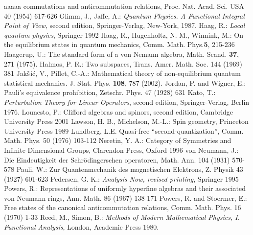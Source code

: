 \documentclass{svmult}
\begin{document}
\begin{remark}
\begin{thebibliography}{aaaaa}
  commutations and anticommutation relations, Proc. Nat. Acad. Sci. USA 40
  (1954) 617-626
 Glimm, J., Jaffe, A.: {\it Quantum Physics. A Functional 
Integral Point of View}, second edition, Springer-Verlag, New-York, 1987.
 Haag, R.: {\it Local quantum physics}, Springer 1992
 Haag, R., Hugenholtz, N. M., Winnink, M.: On the equilibrium
  states  in quantum mechanics, Comm. Math. Phys.{\bf  5}, 215-236
 Haagerup, U.: The standard form of a von Nemann
algebra, Math. Scand. {\bf 37}, 271 (1975).
 Halmos, P. R.: Two subspaces, Trans. Amer. Math. Soc. 144 (1969)
  381 
 Jak${\check {\rm s}}$i\'c, V., Pillet, C.-A.: 
Mathematical theory of non-equilibrium quantum statistical 
mechanics. J. Stat. Phys. {\bf 108}, 787 (2002).
 Jordan, P. and Wigner, E.: Pauli's equivalence prohibition,
  Zetschr. Phys. 47 (1928) 631
 Kato, T.: {\em Perturbation Theory for Linear Operators},
second edition,
Springer-Verlag, Berlin 1976.
 Lounesto, P.: Clifford algebras and spinors, second edition,
  Cambridge University Press 2001
 Lawson, H. B., Michelson, M.-L.: Spin geometry, Princeton
  University Press 1989
 Lundberg, L.E. Quasi-free ``second-quantization'',
  Comm. Math. Phys. 50 (1976) 103-112
 Neretin, Y. A.: Category of Symmetries and Infinite-Dimensional
  Groups, Clarendon Press, Oxford 1996 
 von Neumann, J.: Die Eindeutigkeit der Schr\"odingerschen
  operatoren, Math. Ann. 104 (1931) 570-578
 Pauli, W.: Zur Quantenmechanik des magnetischen Elektrons,
  Z. Physik 43 (1927) 601-623
 Pedersen, G. K.: {\em Analysis Now, revised printing}, Springer
  1995 
 Powers, R.: Representations of uniformly hyperfine algebras
  and their associated von Neumann rings, Ann. Math. 86 (1967) 138-171
 Powers, R. and Stoermer, E.: Free states of the canonical
   anticommutation relations, Comm. Math. Phys. 16 (1970) 1-33
 Reed, M., Simon, B.:
 {\em Methods of Modern Mathematical Physics, I. Functional 
Analysis}, London, Academic Press 1980. 

\end{thebibliography}
\end{remark}
\end{document}
